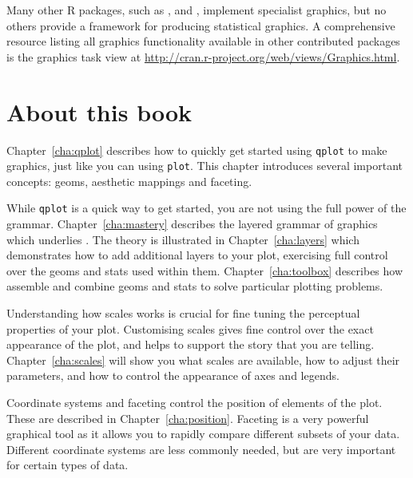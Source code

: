 Many other R packages, such as  \citep{meyer:2006},  \citep{plotrix} and  \citep{gplots}, implement specialist graphics, but no others provide a framework for producing statistical graphics.  A comprehensive resource listing all graphics functionality available in other contributed packages is the graphics task view at \url{http://cran.r-project.org/web/views/Graphics.html}.  

\section{About this book}

Chapter~\ref{cha:qplot} describes how to quickly get started using {\tt qplot} to make graphics, just like you can using {\tt plot}.  This chapter introduces several important \ggplot concepts: geoms, aesthetic mappings and faceting.
  
While {\tt qplot} is a quick way to get started, you are not using the full power of the grammar.  Chapter~\ref{cha:mastery} describes the layered grammar of graphics which underlies \ggplot.  The theory is illustrated in Chapter~\ref{cha:layers} which demonstrates how to add additional layers to your plot, exercising full control over the geoms and stats used within them.  Chapter~\ref{cha:toolbox} describes how assemble and combine geoms and stats \ggplot to solve particular plotting problems.

Understanding how scales works is crucial for fine tuning the perceptual properties of your plot.  Customising scales gives fine control over the exact appearance of the plot, and helps to support the story that you are telling.  Chapter~\ref{cha:scales} will show you what scales are available, how to adjust their parameters, and how to control the appearance of axes and legends.

Coordinate systems and faceting control the position of elements of the plot.  These are described in Chapter~\ref{cha:position}.  Faceting is a very powerful graphical tool as it allows you to rapidly compare different subsets of your data.  Different coordinate systems are less commonly needed, but are very important for certain types of data.


